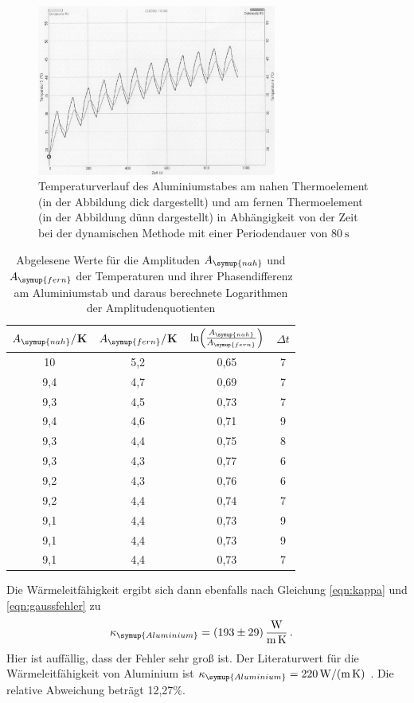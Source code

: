 \begin{figure}
  \centering
  \includegraphics[width=0.7\textwidth]{data/t5undt6_welle.JPEG}
  \caption{Temperaturverlauf des Aluminiumstabes am nahen Thermoelement (in der Abbildung dick dargestellt)
  und am fernen Thermoelement (in der Abbildung dünn dargestellt) in Abhängigkeit von der Zeit bei der
  dynamischen Methode mit einer Periodendauer von $\SI{80}{\second}$}
  \label{fig:aluminium_welle}
\end{figure}

\begin{table}
  \centering
  \caption{Abgelesene Werte für die Amplituden $A_{\symup{nah}}$ und $A_{\symup{fern}}$ der Temperaturen und
  ihrer Phasendifferenz am Aluminiumstab und daraus berechnete Logarithmen der Amplitudenquotienten}
  \label{tab:aluminium_welle}
  \begin{tabular}{c c c c}
    \toprule
     $A_{\symup{nah}}/$K  & $A_{\symup{fern}}/$K & $\ln\Bigl(\frac{A_{\symup{nah}}}{A_{\symup{fern}}}\Bigr)$ & $\Delta t$ \\
    \midrule
    10  	& 5,2  &  0,65 &  7 \\
    9,4	  & 4,7	 &  0,69 &  7 \\
    9,3	  & 4,5	 &  0,73 &  7 \\
    9,4	  & 4,6	 &  0,71 &  9 \\
    9,3	  & 4,4	 &  0,75 &  8 \\
    9,3	  & 4,3	 &  0,77 &  6 \\
    9,2	  & 4,3	 &  0,76 &  6 \\
    9,2	  & 4,4	 &  0,74 &  7 \\
    9,1	  & 4,4	 &  0,73 &  9 \\
    9,1	  & 4,4	 &  0,73 &  9 \\
    9,1	  & 4,4	 &  0,73 &  7 \\
    \bottomrule
  \end{tabular}
\end{table}
Die Wärmeleitfähigkeit ergibt sich dann ebenfalls nach Gleichung \eqref{eqn:kappa}
und \eqref{eqn:gaussfehler} zu
\begin{align}
  \kappa_{\symup{Aluminium}} &= \SI{193(29)}{\watt\per\meter\per\kelvin}\,.\nonumber
\end{align}
Hier ist auffällig, dass der Fehler sehr groß ist.
Der Literaturwert für die Wärmeleitfähigkeit von Aluminium ist
$\kappa_{\symup{Aluminium}} = \SI{220}{\watt\per\meter\per\kelvin}$ \cite{Wärmeleitfähigkeit1}. Die relative
Abweichung beträgt 12,27\%.


